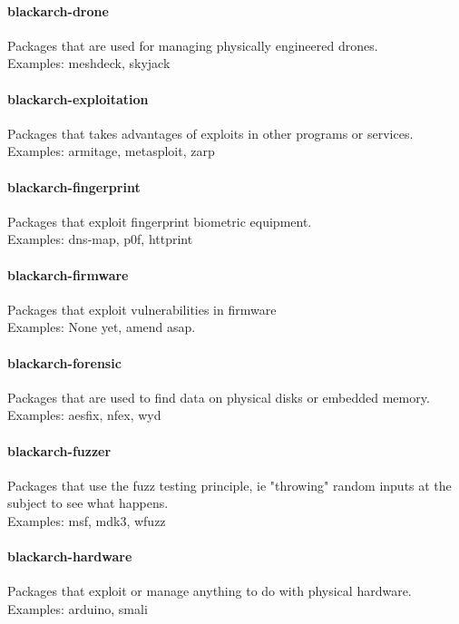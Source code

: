 \documentclass[a4paper, oneside,12pt]{scrartcl}
\begin{document}
\paragraph{blackarch-drone}
Packages that are used for managing physically engineered
drones.
\\
Examples: meshdeck, skyjack

\paragraph{blackarch-exploitation}
Packages that takes advantages of exploits in other programs or services.
\\
Examples: armitage, metasploit, zarp

\paragraph{blackarch-fingerprint}
Packages that exploit fingerprint biometric equipment.
\\
Examples: dns-map, p0f, httprint

\paragraph{blackarch-firmware}
Packages that exploit vulnerabilities in firmware
\\
Examples: None yet, amend asap.

\paragraph{blackarch-forensic}
Packages that are used to find data on physical disks or embedded memory.
\\
Examples: aesfix, nfex, wyd

\paragraph{blackarch-fuzzer}
Packages that use the fuzz testing principle, ie
"throwing" random inputs at the subject to see what happens.
\\
Examples: msf, mdk3, wfuzz

\paragraph{blackarch-hardware}
Packages that exploit or manage anything to do with
physical hardware.
\\
Examples: arduino, smali
\end{document}
